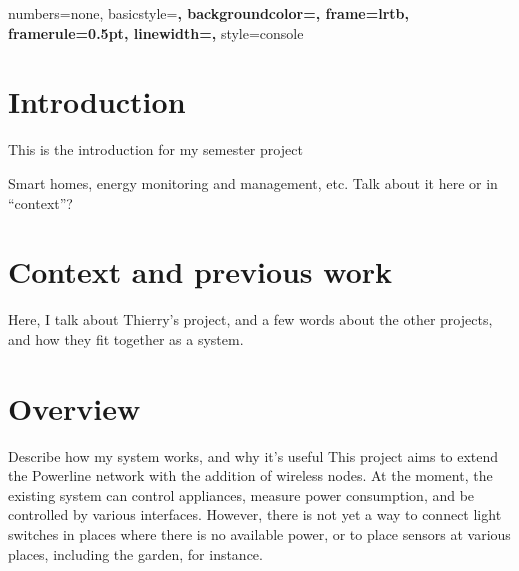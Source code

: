 
\newpage{}

\fancyfoot{}
\lhead{}
\cfoot{\thepage}        %
\rfoot{\today} %



\tableofcontents{}

\newpage

\lstset{language=C}


{
  numbers=none,
  basicstyle=\bf\ttfamily,
  backgroundcolor=\color{grey92},
  frame=lrtb,
  framerule=0.5pt,
  linewidth=\textwidth,
}
{
  style=console
}

\lstset{
  style=console
}



\section*{Introduction}
This is the introduction for my semester project

Smart homes, energy monitoring and management, etc. Talk about it here or in
``context''?

\section{Context and previous work}
Here, I talk about Thierry's project, and a few words about the other projects,
and how they fit together as a system.

\section{Overview}
Describe how my system works, and why it's useful
This project aims to extend the Powerline network with the addition of wireless
nodes. At the moment, the existing system can control appliances, measure power
consumption, and be controlled by various interfaces. However, there is not yet
a way to connect light switches in places where there is no available power, or
to place sensors at various places, including the garden, for instance.

